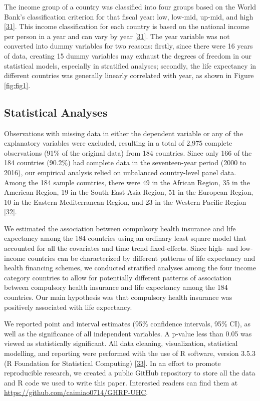 \documentclass[]{elsarticle} %
\begin{document}
The income group of a country was classified into four groups based on the World Bank's classification criterion for that fiscal year: low, low-mid, up-mid, and high {[}\protect\hyperlink{ref-worldbankincome}{31}{]}. This income classification for each country is based on the national income per person in a year and can vary by year {[}\protect\hyperlink{ref-worldbankincome}{31}{]}.
The year variable was not converted into dummy variables for two reasons: firstly, since there were 16 years of data, creating 15 dummy variables may exhaust the degrees of freedom in our statistical models, especially in stratified analyses; secondly, the life expectancy in different countries was generally linearly correlated with year, as shown in Figure \ref{fig:fig1}.

\hypertarget{statistical-analyses}{%
\subsection{Statistical Analyses}\label{statistical-analyses}}

Observations with missing data in either the dependent variable or any of the explanatory variables were excluded, resulting in a total of 2,975 complete observations (91\% of the original data) from 184 countries.
Since only 166 of the 184 countries (90.2\%) had complete data in the seventeen-year period (2000 to 2016), our empirical analysis relied on unbalanced country-level panel data.
Among the 184 sample countries, there were 49 in the African Region, 35 in the American Region, 19 in the South-East Asia Region, 51 in the European Region, 10 in the Eastern Mediterranean Region, and 23 in the Western Pacific Region {[}\protect\hyperlink{ref-WHOregion}{32}{]}.

We estimated the association between compulsory health insurance and life expectancy among the 184 countries using an ordinary least square model that accounted for all the covariates and time trend fixed-effects.
Since high- and low-income countries can be characterized by different patterns of life expectancy and health financing schemes, we conducted stratified analyses among the four income category countries to allow for potentially different patterns of association between compulsory health insurance and life expectancy among the 184 countries.
Our main hypothesis was that compulsory health insurance was positively associated with life expectancy.

We reported point and interval estimates (95\% confidence intervals, 95\% CI), as well as the significance of all independent variables.
A p-value less than 0.05 was viewed as statistically significant.
All data cleaning, visualization, statistical modelling, and reporting were performed with the use of R software, version 3.5.3 (R Foundation for Statistical Computing) {[}\protect\hyperlink{ref-R353}{33}{]}.
In an effort to promote reproducible research, we created a public GitHub repository to store all the data and R code we used to write this paper.
Interested readers can find them at \url{https://github.com/caimiao0714/GHRP-UHC}.
\end{document}

